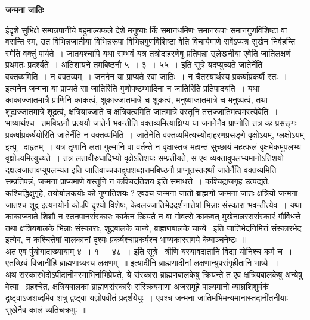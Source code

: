 \documentclass[11pt, openany]{book}
\begin{document}
\begin{center}
\textbf{\Large जन्मना जातिः \textendash\ }
\end{center}

ईदृशे सुभिक्षे सम्पन्नपानीये बहुमाल्यफले देशे मनुष्याः किं समानधर्मिणः समानरूपाः समानगुणविशिष्टा वा वसन्ति स्म, उत विभिन्नजातीया विभिन्नरूपा विभिन्नगुणविशिष्टा वेति विचार्यमाणे सर्वेऽप्यत्र सुखेन निर्वहन्ति स्मेति वक्तुं पार्यते~। जातयश्चापि यथा सम्भवं यत्र तत्रोदाहरणेषु प्रतिपन्ना उ्लेखनीया एवेति जातिलक्षणं प्रथमतः प्रदर्श्यते~। अतिशायने तमबिष्ठनौ ५~। ३~। ५५~। इति सूत्रे {\qt यदप्युच्यते जातेर्नेति वक्तव्यमिति~। न वक्तव्यम्~। जननेन या प्राप्यते स्वा जातिः~। न चैतस्यार्थस्य प्रकर्षाप्रकर्षौ स्तः~।} इत्यनेन जन्मना या प्राप्यते सा जातिरिति गुणोपष्टम्भादिना न जातिरिति प्रतिपादयति~। यथा काकाज्जातमात्रै प्राणिनि काकत्वं, शुकाज्जातमात्रे च शुकत्वं, मनुष्याजातमात्रे च मनुष्यत्वं, तथा शूद्राज्जातमात्रे शूद्रत्वं, क्षत्रियाज्जाते च क्षत्रियत्वमिति जातमात्रे वस्तुनि तत्तज्जातिमत्वमस्त्येवेति~। भाष्यार्थश्च \textendash\ तमबिष्ठनौ प्रत्ययौ जातेर्न भवन्तीति वक्तव्यमित्याक्षिप्य या जननेनैव प्राप्नोति तत्र कः प्रसङ्गः प्रकर्षाप्रकर्षयोरिति जातेर्नैति न वक्तव्यमिति~। जातेनेति वक्तव्यमित्यस्योदाहरणप्रसङ्गे {\qt वृक्षोऽयम्, प्लक्षोऽयम्} इत्यु \textendash\ दाहृतम्~। यत्र तृणानि लता गुल्मानि वा वर्तन्ते न वृक्षास्तत्र महान्तं सुच्छायं महत्फलं वृक्षमेकमुपलभ्य वृक्षोsयमित्युच्यते~। तत्र लतावीरुधादिभ्यो वृक्षेऽतिशयः सम्प्रतीयते, स एव व्यक्तावुपलभ्यमानोऽतिशयो दक्षत्वजातावप्युपलभ्यत इति जातिवाच्चकाद्वृक्षशब्दात्तमबिध्ठनौ प्राप्नुतस्तदर्थां जातेर्नैति वक्तव्यमिति सम्प्रतिपन्नं, जन्मना प्राप्यमाणे वस्तुनि न कश्चिदतिशय इति समाधत्ते~। कश्चिद्राजगृह उत्पद्यते, कश्चिद्धिक्षुगृहे, तयोर्बालकयोः को गुणातिशयः ? एवञ्च जन्मना जातो ब्राह्मणो जन्मना जातः क्षत्रियो जन्मना जातश्च शूद्व इत्यनयोर्न कोsपि दृश्यो विशेषः, केवलज्जातिभेददर्शनात्तेषां भिन्नाः संस्कारा भवन्तीत्येव~। यथा काकाज्जाते शिशौ न स्तनपानसंस्कारः काकेन क्रियते न वा गोवत्से काकवत् मुखेनान्नरससंस्कारं गौर्विधत्ते तथा क्षत्रियबालके भिन्नाः संस्काराः, शूद्रबालके चान्ये, ब्राह्मणबालके चान्ये \textendash\ इति जातिभेदनिमित्तं संस्कारभेद इत्येव, न कश्चित्तेषां बालकानां दृश्यः प्रकर्षश्चाप्रकर्षश्च भाष्यकारसमये केषाञ्चनेष्टः~॥\\

अत एव पुंयोगादाख्यायाम् ४~। १~। ४८~। इति सूत्रे \textendash\ त्रीणि यस्यावदातानि विद्या योनिश्च कर्म च~। एतय्छिवं विजानीहि ब्राह्मणाग्र्यस्य लक्षणम्~॥ इत्यादीनि ब्राह्मणादीनां लक्षणान्युपसंगृहीतानि भाष्ये~॥\\

अथ संस्कारभेदोऽपीदानीमस्माभिर्नाभिप्रेयते, ये संस्कारा ब्राह्मणबालकेषु क्रियन्ते त एव क्षत्रियबालकेषु अन्येषु वेत्या \textendash\ ग्रहश्चेत, क्षत्रियबालका ब्राह्मणसंस्कारैः संस्क्रियमाणा अजसमूहे पाल्यमानो व्याघ्रशिशुर्वकं दृष्ट्वाऽजशब्दमिव शत्रु द्वष्ट्वा यज्ञोपवीतं प्रदर्शयेयुः~। एवश्च जन्मना जातिमभिमन्यमानास्तदानींतनीयाः सुखेनैव कालं व्यतिचक्रमुः~॥\\
\end{document}

